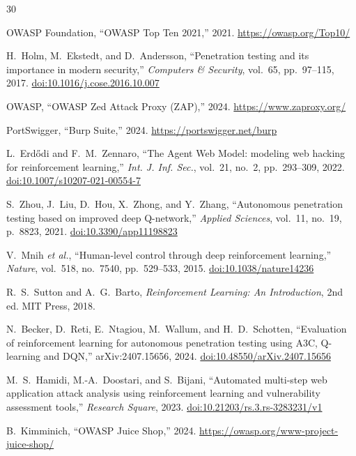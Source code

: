 \documentclass[a4paper,12pt]{article}
\begin{document}
\begin{thebibliography}{30}

 OWASP Foundation, ``OWASP Top Ten 2021,'' 2021. \url{https://owasp.org/Top10/}

 H.~Holm, M.~Ekstedt, and D.~Andersson, ``Penetration testing and its importance in modern security,'' \emph{Computers \& Security}, vol.~65, pp.~97--115, 2017. \href{https://doi.org/10.1016/j.cose.2016.10.007}{doi:10.1016/j.cose.2016.10.007}

 OWASP, ``OWASP Zed Attack Proxy (ZAP),'' 2024. \url{https://www.zaproxy.org/}

 PortSwigger, ``Burp Suite,'' 2024. \url{https://portswigger.net/burp}

 L.~Erd{\H o}di and F.~M.~Zennaro, ``The Agent Web Model: modeling web hacking for reinforcement learning,'' \emph{Int. J. Inf. Sec.}, vol.~21, no.~2, pp.~293--309, 2022. \href{https://doi.org/10.1007/s10207-021-00554-7}{doi:10.1007/s10207-021-00554-7}

 S.~Zhou, J.~Liu, D.~Hou, X.~Zhong, and Y.~Zhang, ``Autonomous penetration testing based on improved deep Q-network,'' \emph{Applied Sciences}, vol.~11, no.~19, p.~8823, 2021. \href{https://doi.org/10.3390/app11198823}{doi:10.3390/app11198823}

 V.~Mnih \emph{et al.}, ``Human-level control through deep reinforcement learning,'' \emph{Nature}, vol.~518, no.~7540, pp.~529--533, 2015. \href{https://doi.org/10.1038/nature14236}{doi:10.1038/nature14236}

 R.~S.~Sutton and A.~G.~Barto, \emph{Reinforcement Learning: An Introduction}, 2nd ed. MIT Press, 2018.

 N.~Becker, D.~Reti, E.~Ntagiou, M.~Wallum, and H.~D.~Schotten, ``Evaluation of reinforcement learning for autonomous penetration testing using A3C, Q-learning and DQN,'' arXiv:2407.15656, 2024. \href{https://doi.org/10.48550/arXiv.2407.15656}{doi:10.48550/arXiv.2407.15656}

 M.~S.~Hamidi, M.-A.~Doostari, and S.~Bijani, ``Automated multi-step web application attack analysis using reinforcement learning and vulnerability assessment tools,'' \emph{Research Square}, 2023. \href{https://doi.org/10.21203/rs.3.rs-3283231/v1}{doi:10.21203/rs.3.rs-3283231/v1}

 B.~Kimminich, ``OWASP Juice Shop,'' 2024. \url{https://owasp.org/www-project-juice-shop/}


\end{thebibliography}
\end{document}
